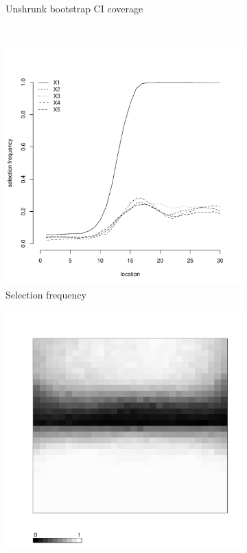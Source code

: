 \documentclass[authoryear, review, 11pt]{elsarticle}
\begin{document}
\begin{figure}
\begin{subfigure}[b]{0.45\textwidth}
		\caption{Unshrunk bootstrap CI coverage}
	\end{subfigure}%
	~ %
	\begin{subfigure}[b]{0.45\textwidth}
	\centering
		\includegraphics[width=\textwidth]{../../figures/simulation/15.1.profile_selection.pdf}
		\caption{Selection frequency}
	\end{subfigure}
	\begin{subfigure}[b]{0.45\textwidth}
	\centering
		\includegraphics[width=\textwidth]{../../figures/simulation/X1.15.1.unshrunk_bootstrap_coverage.pdf}

\end{subfigure}
\end{figure}
\end{document}
